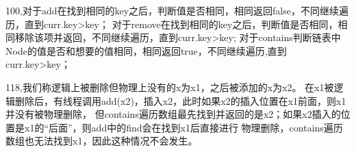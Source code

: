 \documentclass[UTF8]{ctexart}
\begin{document}
 100,对于add在找到相同的key之后，判断值是否相同，相同返回false，不同继续遍历，直到curr.key>key；
 对于remove在找到相同的key之后，判断值是否相同，相同移除该项并返回，不同继续遍历，直到curr.key>key;
 对于contains判断链表中Node的值是否和想要的值相同，相同返回true，不同继续遍历,直到curr.key>key；

 118,我们称逻辑上被删除但物理上没有的x为x1，之后被添加的x为x2。
 在x1被逻辑删除后，有线程调用add(x2)，插入x2，此时如果x2的插入位置在x1前面，则x1并没有被物理删除，
 但contains遍历数组最先找到并返回的是x2；如果x2插入的位置是x1的“后面”，则add中的find会在找到x1后直接进行
 物理删除，contains遍历数组也无法找到x1，因此这种情况不会发生。
\end{document}
